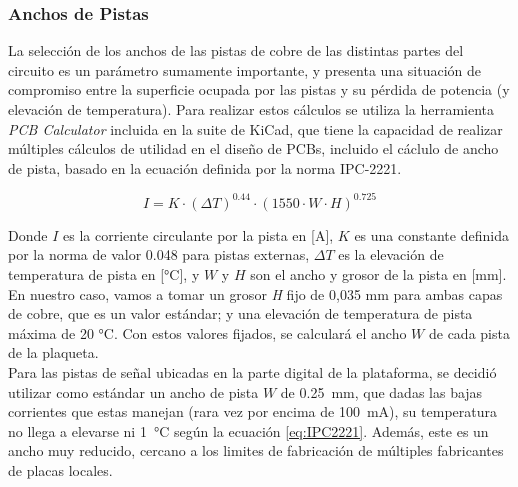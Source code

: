 \subsubsection{Anchos de Pistas}

La selección de los anchos de las pistas de cobre de las distintas partes del circuito es un parámetro sumamente importante, y presenta una situación de compromiso entre la superficie ocupada por las pistas y su pérdida de potencia (y elevación de temperatura). Para realizar estos cálculos se utiliza la herramienta \textit{PCB Calculator} incluida en la suite de KiCad, que tiene la capacidad de realizar múltiples cálculos de utilidad en el diseño de PCBs, incluido el cáclulo de ancho de pista, basado en la ecuación definida por la norma IPC-2221.

\begin{equation}\label{eq:IPC2221}
    I = K\cdot (\Delta T)^{\num{0.44}}\cdot (\num{1550}\cdot W\cdot H)^{\num{0.725}}
\end{equation}

Donde $I$ es la corriente circulante por la pista en [\unit{\ampere}], $K$ es una constante definida por la norma de valor \num{0.048} para pistas externas, $\Delta T$ es la elevación de temperatura de pista en [\unit{\celsius}], y $W$ y $H$ son el ancho y grosor de la pista en [\unit{\milli\metre}].\\

En nuestro caso, vamos a tomar un {\Medium grosor \textit{H} fijo de 0,035 mm} para ambas capas de cobre, que es un valor estándar; y una {\Medium elevación de temperatura de pista máxima de 20 °C}. Con estos valores fijados, se calculará el ancho $W$ de cada pista de la plaqueta.\\

Para las pistas de señal ubicadas en la parte digital de la plataforma, se decidió utilizar como estándar un ancho de pista $W$ de \SI[]{0.25}[]{\milli\metre}, que dadas las bajas corrientes que estas manejan (rara vez por encima de \SI[]{100}[]{\milli\ampere}), su temperatura no llega a elevarse ni \SI[]{1}[]{\celsius} según la ecuación \ref{eq:IPC2221}. Además, este es un ancho muy reducido, cercano a los limites de fabricación de múltiples fabricantes de placas locales.\\

\afterpage{\blankpage}